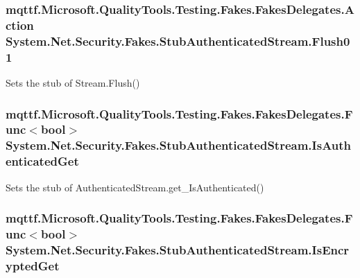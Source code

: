 \hypertarget{class_system_1_1_net_1_1_security_1_1_fakes_1_1_stub_authenticated_stream_abd5adaec9765b16dacf7cf21e3992585}{
\subsubsection[{Flush01}]{\setlength{\rightskip}{0pt plus 5cm}mqttf.\-Microsoft.\-Quality\-Tools.\-Testing.\-Fakes.\-Fakes\-Delegates.\-Action System.\-Net.\-Security.\-Fakes.\-Stub\-Authenticated\-Stream.\-Flush01}}\label{class_system_1_1_net_1_1_security_1_1_fakes_1_1_stub_authenticated_stream_abd5adaec9765b16dacf7cf21e3992585}


Sets the stub of Stream.\-Flush()

\hypertarget{class_system_1_1_net_1_1_security_1_1_fakes_1_1_stub_authenticated_stream_aaafcca4332bc60a3eaa3058159e990f0}{
\subsubsection[{Is\-Authenticated\-Get}]{\setlength{\rightskip}{0pt plus 5cm}mqttf.\-Microsoft.\-Quality\-Tools.\-Testing.\-Fakes.\-Fakes\-Delegates.\-Func$<$bool$>$ System.\-Net.\-Security.\-Fakes.\-Stub\-Authenticated\-Stream.\-Is\-Authenticated\-Get}}\label{class_system_1_1_net_1_1_security_1_1_fakes_1_1_stub_authenticated_stream_aaafcca4332bc60a3eaa3058159e990f0}


Sets the stub of Authenticated\-Stream.\-get\-\_\-\-Is\-Authenticated()

\hypertarget{class_system_1_1_net_1_1_security_1_1_fakes_1_1_stub_authenticated_stream_a7ff19c6b1de0fc4f344a2a861ea06a15}{
\subsubsection[{Is\-Encrypted\-Get}]{\setlength{\rightskip}{0pt plus 5cm}mqttf.\-Microsoft.\-Quality\-Tools.\-Testing.\-Fakes.\-Fakes\-Delegates.\-Func$<$bool$>$ System.\-Net.\-Security.\-Fakes.\-Stub\-Authenticated\-Stream.\-Is\-Encrypted\-Get}}\label{class_system_1_1_net_1_1_security_1_1_fakes_1_1_stub_authenticated_stream_a7ff19c6b1de0fc4f344a2a861ea06a15}


